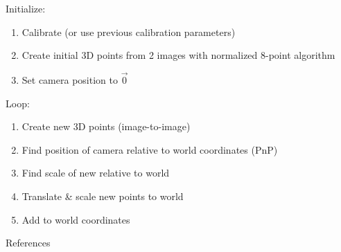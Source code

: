 \documentclass{beamer}
\begin{document}
\begin{frame}
	Initialize:
	\begin{enumerate}
		\item Calibrate (or use previous calibration parameters)
		\item Create initial 3D points from 2 images with normalized 8-point
			algorithm \cite{longuet1981, Hartley2000}
		\item Set camera position to $\vec{0}$
			\setcounter{enumTemp}{\theenumi}
	\end{enumerate}
	Loop:
	\begin{enumerate}
			 \setcounter{enumi}{\theenumTemp}
		\item Create new 3D points (image-to-image)
		\item Find position of camera relative to world coordinates (PnP)
		\item Find scale of new relative to world
		\item Translate \& scale new points to world
		\item Add to world coordinates
	\end{enumerate}
\end{frame}




\begin{frame}{References}
	
	
\end{frame}
\end{document}
